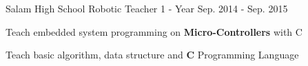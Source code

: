 \begin{cventries}
    
  \cventry
    {Salam High School} %
    {Robotic Teacher} %
    {1 - Year} %
    {Sep. 2014 - Sep. 2015} %
    {
      \begin{cvitems} %
        \item {Teach embedded system programming on \textbf{Micro-Controllers} with C}
        \item {Teach basic algorithm, data structure and \textbf{C} Programming Language}
      \end{cvitems}
    }




\end{cventries}

